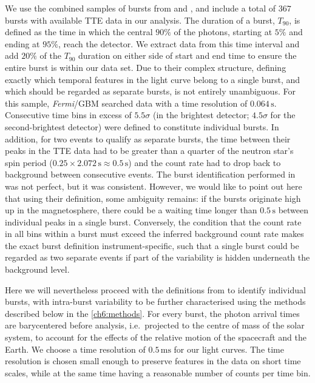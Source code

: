 \documentclass[12pt]{emulateapj}
\newcommand{\project}[1]{\textsl{#1}}
\newcommand{\fermi}{\project{Fermi}}
\begin{document}
We use the combined samples of bursts from \citet{vonkienlin2012} and \citet{vanderhorst2012}, and include a total of $367$ bursts with available TTE data in our analysis. The duration of a burst, $T_{90}$, is defined as the time in which the central $90\%$ of the photons, starting at $5\%$ and ending at $95\%$, reach the detector.  We extract data from this time interval and add $20\%$ of the $T_{90}$ duration on either side of start and end time to ensure the entire burst is within our data set. Due to their complex structure, defining exactly which temporal features in the light curve belong to a single burst, and which should be regarded as separate bursts, is 
not entirely unambiguous. For this sample, \citet{vanderhorst2012} \fermi/GBM searched data with a time resolution of $0.064\,\mathrm{s}$. Consecutive time bins in excess of $5.5\sigma$ 
(in the brightest detector; $4.5\sigma$ for the second-brightest detector) were defined to constitute individual bursts. In addition, for two events to qualify as separate bursts, the time between their peaks
in the TTE data had to be greater than a quarter of the neutron star's spin period ($0.25\times2.072\,\mathrm{s} \approx 0.5\,\mathrm{s}$) 
and the count rate had to drop back to background between consecutive events. 
The burst identification performed in \citet{vanderhorst2012} was not perfect, but it was consistent. However, we would like to point out here that using their definition, 
some ambiguity remains: if the bursts originate high up in the magnetosphere, there could be a waiting 
time longer than $0.5\,\mathrm{s}$ between individual peaks in a single burst. Conversely, the condition that the count rate in all bins within a burst must
exceed the inferred background count rate makes the exact burst definition instrument-specific, such that a single burst could be regarded as two separate events
if part of the variability is hidden underneath the background level.

Here we will nevertheless proceed with the definitions from \citet{vanderhorst2012} to identify individual bursts, with intra-burst variability to be further characterised using the 
methods described below in the \ref{ch6:methods}. For every burst, the photon arrival times 
are barycentered before analysis, i.e.\ projected to the centre of mass of the solar system, to account for the effects of the relative motion of the spacecraft and the Earth.
We choose a time resolution of $0.5\,\mathrm{ms}$ for our light curves. The time resolution is chosen small enough to preserve features
in the data on short time scales, while at the same time having a reasonable number of counts per time bin. 
\end{document}
